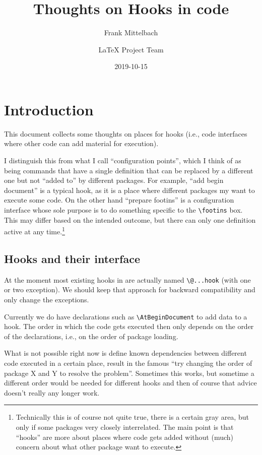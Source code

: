 \documentclass{article}
\title{Thoughts on Hooks in code}
\author{Frank Mittelbach \and
  \LaTeX{} Project Team}
\date{2019-10-15}
\newcounter{hook}
\newcounter{config}
\newcommand\cs[1]{\texttt{\textbackslash #1}}
\begin{document}
\maketitle

\tableofcontents

\section{Introduction}


This document collects some thoughts on places for hooks (i.e., code
interfaces where other code can add material for execution).

I distinguish this from what I call  ``configuration points'', which I think of as
being commands that have a single definition that can be replaced by a
different one but not ``added to'' by different packages. For example,
``add begin document'' is a typical hook, as it is a place where
different packages my want to execute some code. On the other hand
``prepare footins'' is a configuration interface whose sole purpose is
to do something specific to the \cs{footins} box. This may differ
based on the intended outcome, but there can only one definition active at any
time.\footnote{Technically this is of course not quite true, there is
  a certain gray area, but only if some packages very closely
  interrelated. The main point is that ``hooks'' are more about places
  where code gets added without (much) concern about what other
  package want to execute.}


\subsection{Hooks and their interface}

At the moment most existing hooks in \LaTeXe{} are actually named
\cs{@...hook} (with one or two exception). We should keep that
approach for backward compatibility and only change the exceptions.

Currently we do have declarations such as \cs{AtBeginDocument} to add
data to a hook.  The order in which the code gets executed then only
depends on the order of the declarations, i.e., on the order of
package loading.

What is not possible right now is define known dependencies between
different code executed in a certain place, result in the famous ``try
changing the order of package X and Y to resolve the
problem''. Sometimes this works, but sometime a different order would
be needed for different hooks and then of course that advice doesn't
really any longer work.
\end{document}
